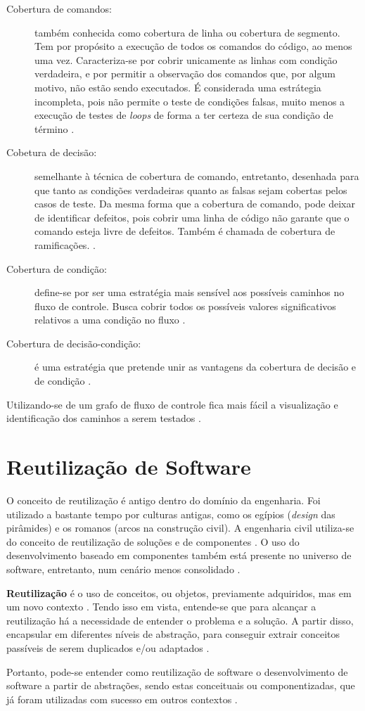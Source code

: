 \begin{description}
\item[Cobertura de comandos:] também conhecida como cobertura de linha ou
cobertura de segmento. Tem por propósito a execução de todos os comandos do
código, ao menos uma vez. Caracteriza-se por cobrir unicamente as linhas com
condição verdadeira, e por permitir a observação dos comandos que, por algum
motivo, não estão sendo executados. É considerada uma estrátegia incompleta,
pois não permite o teste de condições falsas, muito menos a execução de testes
de \textit{loops} de forma a ter certeza de sua condição de término
\cite{myers2004}.
\item[Cobetura de decisão:] semelhante à técnica de cobertura de comando,
entretanto, desenhada para que tanto as condições verdadeiras quanto as falsas
sejam cobertas pelos casos de teste. Da mesma forma que a cobertura de comando,
pode deixar de identificar defeitos, pois cobrir uma linha de código não
garante que o comando esteja livre de defeitos. Também é chamada de cobertura
de ramificações. \cite{myers2004}.
\item[Cobertura de condição:] define-se por ser uma estratégia mais sensível
aos possíveis caminhos no fluxo de controle. Busca cobrir todos os possíveis
valores significativos relativos a uma condição no fluxo \cite{myers2004}.
\item[Cobertura de decisão-condição:] é uma estratégia que pretende unir as
vantagens da cobertura de decisão e de condição \cite{myers2004}.
\end{description}
\par
\indent Utilizando-se de um grafo de fluxo de controle fica mais fácil a
visualização e identificação dos caminhos a serem testados \cite{copeland2003}.
\par
\section{Reutilização de Software}
O conceito de reutilização é antigo dentro do domínio da engenharia. Foi
utilizado a bastante tempo por culturas antigas, como os egípios
(\textit{design} das pirâmides) e os romanos (arcos na construção civil).
A engenharia civil utiliza-se do conceito de reutilização de soluções e de
componentes \cite{sutcliffe2002}. O uso do desenvolvimento baseado em
componentes também está presente no universo de software, entretanto, num
cenário menos consolidado \cite{sutcliffe2002}.
\par
\indent \textbf{Reutilização} é o uso de conceitos, ou objetos, previamente
adquiridos, mas em um novo contexto \cite{sutcliffe2002}. Tendo isso em vista,
entende-se que para alcançar a reutilização há a necessidade de entender o
problema e a solução. A partir disso, encapsular em diferentes níveis de
abstração, para conseguir extrair conceitos passíveis de serem duplicados e/ou
adaptados \cite{sutcliffe2002}.
\par
\indent Portanto, pode-se entender como reutilização de software o
desenvolvimento de software a partir de abstrações, sendo estas conceituais ou
componentizadas, que já foram utilizadas com sucesso em outros contextos
\cite{sutcliffe2002}.

